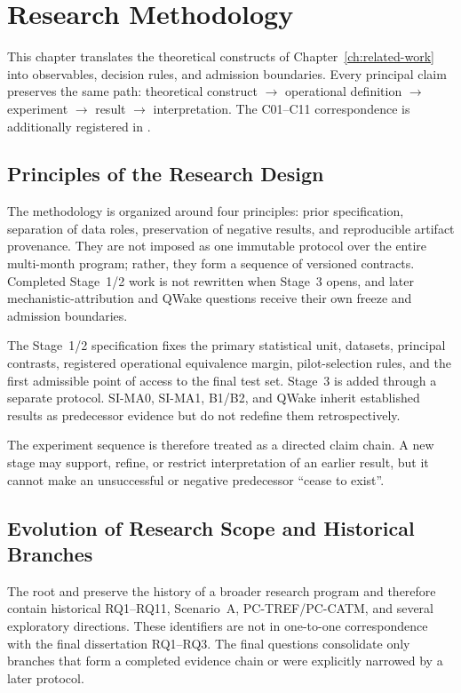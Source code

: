\chapter{Research Methodology}
\label{chap:methodology-en}

This chapter translates the theoretical constructs of Chapter~\ref{ch:related-work}
into observables, decision rules, and admission boundaries. Every principal claim
preserves the same path: theoretical construct $\rightarrow$ operational definition
$\rightarrow$ experiment $\rightarrow$ result $\rightarrow$ interpretation. The
C01--C11 correspondence is additionally registered in
.

\section{Principles of the Research Design}

The methodology is organized around four principles: prior specification, separation
of data roles, preservation of negative results, and reproducible artifact provenance.
They are not imposed as one immutable protocol over the entire multi-month program;
rather, they form a sequence of versioned contracts. Completed Stage~1/2 work is not
rewritten when Stage~3 opens, and later mechanistic-attribution and QWake questions
receive their own freeze and admission boundaries.

The Stage~1/2 specification fixes the primary statistical unit, datasets, principal
contrasts, registered operational equivalence margin, pilot-selection rules, and the
first admissible point of access to the final test set. Stage~3 is added through a
separate protocol. SI-MA0, SI-MA1, B1/B2, and QWake inherit established results as
predecessor evidence but do not redefine them retrospectively.

The experiment sequence is therefore treated as a directed claim chain. A new stage
may support, refine, or restrict interpretation of an earlier result, but it cannot
make an unsuccessful or negative predecessor ``cease to exist''.

\section{Evolution of Research Scope and Historical Branches}
\label{sec:method-scope-evolution-en}

The root  and  preserve the history of a broader
research program and therefore contain historical RQ1--RQ11, Scenario~A,
PC-TREF/PC-CATM, and several exploratory directions. These identifiers are not in
one-to-one correspondence with the final dissertation RQ1--RQ3. The final questions
consolidate only branches that form a completed evidence chain or were explicitly
narrowed by a later protocol.

